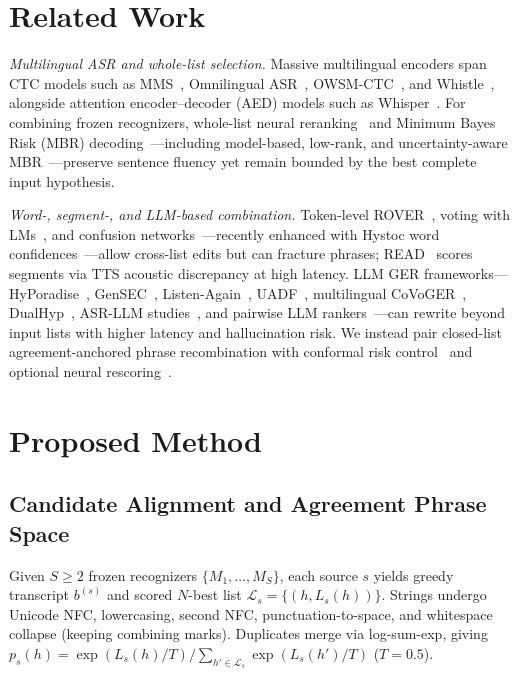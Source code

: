 \documentclass[conference,letterpaper]{IEEEtran}
\begin{document}
\section{Related Work}
\emph{Multilingual ASR and whole-list selection.} Massive multilingual encoders span CTC models such as MMS~\cite{pratap2024mms}, Omnilingual ASR~\cite{omni2025}, OWSM-CTC~\cite{peng2024owsmctc}, and Whistle~\cite{yusuyin2025whistle}, alongside attention encoder--decoder (AED) models such as Whisper~\cite{radford2023whisper}. For combining frozen recognizers, whole-list neural reranking~\cite{yan2025reranking} and Minimum Bayes Risk (MBR) decoding~\cite{goel2000mbr,xu2011mbr}---including model-based, low-rank, and uncertainty-aware MBR~\cite{jinnai2024mbmbr,trabelsi2024lowrankmbr,daheim2025uambr}---preserve sentence fluency yet remain bounded by the best complete input hypothesis.

\emph{Word-, segment-, and LLM-based combination.} Token-level ROVER~\cite{fiscus1997rover}, voting with LMs~\cite{schwenk2000combining}, and confusion networks~\cite{mangu2000consensus}---recently enhanced with Hystoc word confidences~\cite{benes2024hystoc}---allow cross-list edits but can fracture phrases; READ~\cite{li2026read} scores segments via TTS acoustic discrepancy at high latency. LLM GER frameworks---HyPoradise~\cite{chen2023hyporadise}, GenSEC~\cite{yang2024gensec}, Listen-Again~\cite{hu2024listen}, UADF~\cite{chen2024uadf}, multilingual CoVoGER~\cite{yang2025covoger}, DualHyp~\cite{kim2026dualhyp}, ASR-LLM studies~\cite{ma2025correction}, and pairwise LLM rankers~\cite{jiang2023llmblender}---can rewrite beyond input lists with higher latency and hallucination risk. We instead pair closed-list agreement-anchored phrase recombination with conformal risk control~\cite{angelopoulos2024crc} and optional neural rescoring~\cite{yang2025qwen3,martins2024eurollm}.

\section{Proposed Method}
\subsection{Candidate Alignment and Agreement Phrase Space}
Given $S \ge 2$ frozen recognizers $\{M_1,\dots,M_S\}$, each source $s$ yields greedy transcript $b^{(s)}$ and scored $N$-best list $\mathcal{L}_s=\{(h, L_s(h))\}$. Strings undergo Unicode NFC, lowercasing, second NFC, punctuation-to-space, and whitespace collapse (keeping combining marks). Duplicates merge via log-sum-exp, giving $p_s(h)=\exp(L_s(h)/T)/\sum_{h'\in\mathcal{L}_s}\exp(L_s(h')/T)$ ($T=0.5$).
\end{document}
